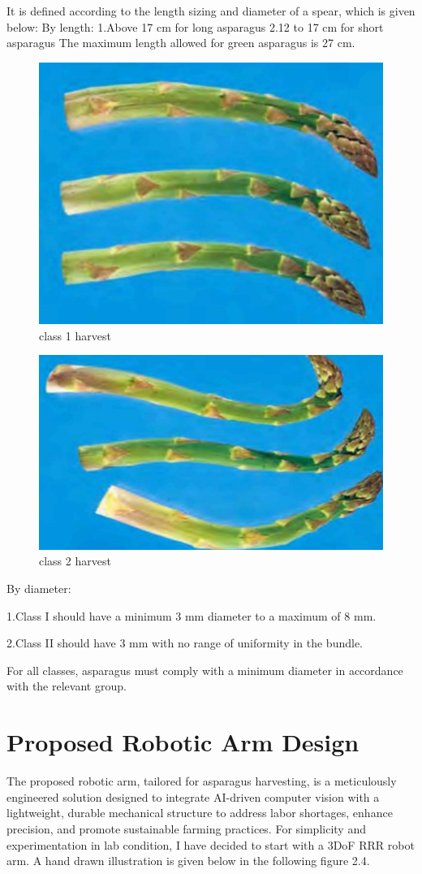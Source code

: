 It is defined according to the length sizing and diameter of a spear, which is given below:
By length:
1.Above 17 cm for long asparagus
2.12 to 17 cm for short asparagus
The maximum length allowed for green asparagus is 27 cm.
\begin{figure}
    \centering
    \includegraphics[width=0.75\linewidth]{pictures/class_1_limitedbending.png}
    \caption{class 1 harvest}
    \label{fig:enter-label}
\end{figure}
\begin{figure}
    \centering
    \includegraphics[width=0.75\linewidth]{pictures/class2_superier_bending.png}
    \caption{class 2 harvest}
    \label{fig:enter-label}
\end{figure}

By diameter:

1.Class I should have a minimum 3 mm diameter to a maximum of 8 mm.

2.Class II should have 3 mm with no range of uniformity in the bundle.

For all classes, asparagus must comply with a minimum 
diameter in accordance with the relevant group.

\section{Proposed Robotic Arm Design}
The proposed robotic arm, tailored for asparagus 
harvesting, is a meticulously engineered solution 
designed to integrate AI-driven computer vision  with a lightweight, 
durable mechanical structure to address labor 
shortages, enhance precision, and promote sustainable 
farming practices. For simplicity and experimentation 
in lab condition, I have decided to start with a 3DoF 
RRR robot arm. A hand drawn illustration is given below 
in the following figure 2.4.




